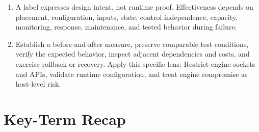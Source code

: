 \documentclass[11pt]{article}
\begin{document}
\begin{enumerate}
\item A label expresses design intent, not runtime proof. Effectiveness depends on placement, configuration, inputs, state, control independence, capacity, monitoring, response, maintenance, and tested behavior during failure.
\item Establish a before-and-after measure, preserve comparable test conditions, verify the expected behavior, inspect adjacent dependencies and costs, and exercise rollback or recovery. Apply this specific lens: Restrict engine sockets and APIs, validate runtime configuration, and treat engine compromise as host-level risk.
\end{enumerate}
\section{Key-Term Recap}
\end{document}
